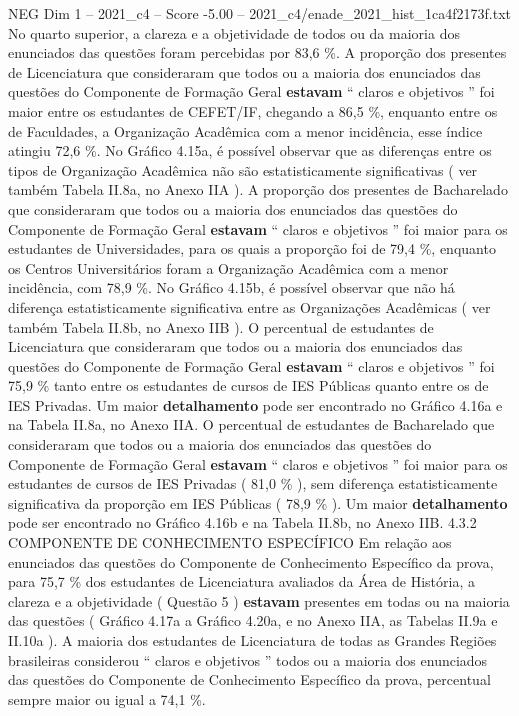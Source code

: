 \begin{textsample}{NEG Dim 1 – 2021\_c4 – Score -5.00 – 2021\_c4/enade\_2021\_hist\_1ca4f2173f.txt}
No quarto superior, a clareza e a objetividade de todos ou da maioria dos enunciados das questões foram percebidas por 83,6 \%.
A proporção dos presentes de Licenciatura que consideraram que todos ou a maioria dos enunciados das questões do Componente de Formação Geral \textbf{estavam} “ claros e objetivos ” foi maior entre os estudantes de CEFET/IF, chegando a 86,5 \%, enquanto entre os de Faculdades, a Organização Acadêmica com a menor incidência, esse índice atingiu 72,6 \%.
No Gráfico 4.15a, é possível observar que as diferenças entre os tipos de Organização Acadêmica não são estatisticamente significativas ( ver também Tabela II.8a, no Anexo IIA ).
A proporção dos presentes de Bacharelado que consideraram que todos ou a maioria dos enunciados das questões do Componente de Formação Geral \textbf{estavam} “ claros e objetivos ” foi maior para os estudantes de Universidades, para os quais a proporção foi de 79,4 \%, enquanto os Centros Universitários foram a Organização Acadêmica com a menor incidência, com 78,9 \%.
No Gráfico 4.15b, é possível observar que não há diferença estatisticamente significativa entre as Organizações Acadêmicas ( ver também Tabela II.8b, no Anexo IIB ).
O percentual de estudantes de Licenciatura que consideraram que todos ou a maioria dos enunciados das questões do Componente de Formação Geral \textbf{estavam} “ claros e objetivos ” foi 75,9 \% tanto entre os estudantes de cursos de IES Públicas quanto entre os de IES Privadas.
Um maior \textbf{detalhamento} pode ser encontrado no Gráfico 4.16a e na Tabela II.8a, no Anexo IIA.
O percentual de estudantes de Bacharelado que consideraram que todos ou a maioria dos enunciados das questões do Componente de Formação Geral \textbf{estavam} “ claros e objetivos ” foi maior para os estudantes de cursos de IES Privadas ( 81,0 \% ), sem diferença estatisticamente significativa da proporção em IES Públicas ( 78,9 \% ).
Um maior \textbf{detalhamento} pode ser encontrado no Gráfico 4.16b e na Tabela II.8b, no Anexo IIB. 4.3.2 COMPONENTE DE CONHECIMENTO ESPECÍFICO Em relação aos enunciados das questões do Componente de Conhecimento Específico da prova, para 75,7 \% dos estudantes de Licenciatura avaliados da Área de História, a clareza e a objetividade ( Questão 5 ) \textbf{estavam} presentes em todas ou na maioria das questões ( Gráfico 4.17a a Gráfico 4.20a, e no Anexo IIA, as Tabelas II.9a e II.10a ).
A maioria dos estudantes de Licenciatura de todas as Grandes Regiões brasileiras considerou “ claros e objetivos ” todos ou a maioria dos enunciados das questões do Componente de Conhecimento Específico da prova, percentual sempre maior ou igual a 74,1 \%.

\end{textsample}
